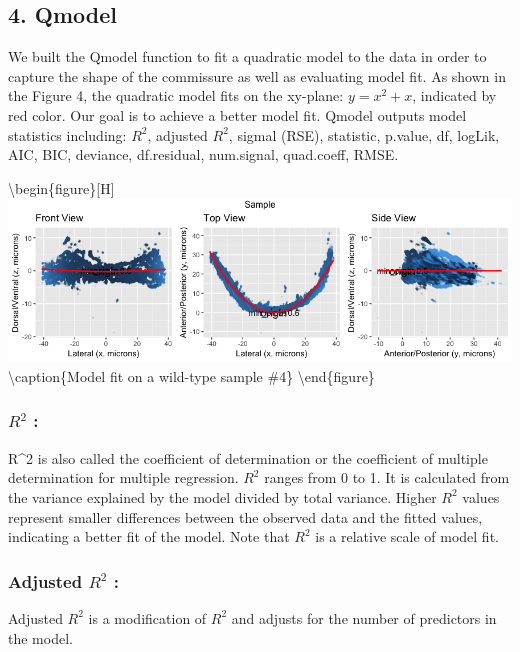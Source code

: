 \documentclass[10pt,letterpaper]{article}
\begin{document}
\hypertarget{qmodel}{%
\subsection{4. Qmodel}\label{qmodel}}

We built the Qmodel function to fit a quadratic model to the data in
order to capture the shape of the commissure as well as evaluating model
fit. As shown in the Figure 4, the quadratic model fits on the xy-plane:
\(y=x^2+x\), indicated by red color. Our goal is to achieve a better
model fit. Qmodel outputs model statistics including: \(R^2\), adjusted
\(R^2\), sigmal (RSE), statistic, p.value, df, logLik, AIC, BIC,
deviance, df.residual, num.signal, quad.coeff, RMSE.

\textbackslash{}begin\{figure\}{[}H{]}
\includegraphics[width=0.9\linewidth]{visualization_paper/wt_04_model}
\textbackslash{}caption\{Model fit on a wild-type sample
\#4\}\label{fig:Figure4} \textbackslash{}end\{figure\}

\hypertarget{r2}{%
\subsubsection{\texorpdfstring{\(R^2\) :}{R\^{}2 :}}\label{r2}}

R\^{}2 is also called the coefficient of determination or the
coefficient of multiple determination for multiple regression. \(R^2\)
ranges from 0 to 1. It is calculated from the variance explained by the
model divided by total variance. Higher \(R^2\) values represent smaller
differences between the observed data and the fitted values, indicating
a better fit of the model. Note that \(R^2\) is a relative scale of
model fit.

\hypertarget{adjusted-r2}{%
\subsubsection{\texorpdfstring{Adjusted \(R^2\)
:}{Adjusted R\^{}2 :}}\label{adjusted-r2}}

Adjusted \(R^2\) is a modification of \(R^2\) and adjusts for the number
of predictors in the model.
\end{document}
